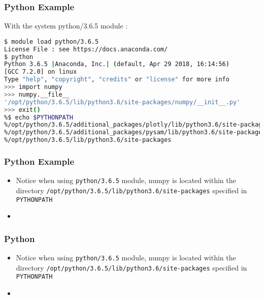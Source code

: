 \documentclass{beamer}
\newcommand{\code}[1]{\colorbox{codegray}{\texttt{#1}}}
\begin{document}
\begin{frame}[fragile]
\frametitle{Python Example}
With the system python/3.6.5 module :
\begingroup
\scriptsize
\begin{lstlisting}[backgroundcolor = \color{codegray}, language = Bash, showstringspaces=false]
$ module load python/3.6.5
License File : see https://docs.anaconda.com/
$ python
Python 3.6.5 |Anaconda, Inc.| (default, Apr 29 2018, 16:14:56)
[GCC 7.2.0] on linux
Type "help", "copyright", "credits" or "license" for more info
>>> import numpy
>>> numpy.__file__
'/opt/python/3.6.5/lib/python3.6/site-packages/numpy/__init__.py'
>>> exit()
%$ echo $PYTHONPATH
%/opt/python/3.6.5/additional_packages/plotly/lib/python3.6/site-packages:
%/opt/python/3.6.5/additional_packages/pysam/lib/python3.6/site-packages:
%/opt/python/3.6.5/lib/python3.6/site-packages
\end{lstlisting}
\endgroup
\end{frame}


\begin{frame}
\frametitle{Python Example}
\begin{itemize}
    \item Notice when using \code{python/3.6.5} module, numpy is located within the directory \code{/opt/python/3.6.5/lib/python3.6/site-packages} specified in \code{PYTHONPATH} 
    \pause
    \item
\end{itemize}
\end{frame}


\begin{frame}
\frametitle{Python}
\begin{itemize}
    \item Notice when using \code{python/3.6.5} module, numpy is located within the directory \code{/opt/python/3.6.5/lib/python3.6/site-packages} specified in \code{PYTHONPATH} 
    \pause
    \item
\end{itemize}
\end{frame}
\end{document}

